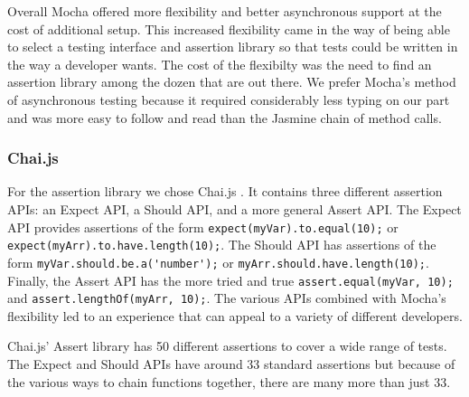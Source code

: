 \documentclass[12pt]{ucthesis}
\begin{document}
Overall Mocha offered more flexibility and better asynchronous support at the cost of additional setup. This increased flexibility came in the way of being able to select a testing interface and assertion library so that tests could be written in the way a developer wants. The cost of the flexibilty was the need to find an assertion library among the dozen that are out there. We prefer Mocha's method of asynchronous testing because it required considerably less typing on our part and was more easy to follow and read than the Jasmine chain of method calls.

\subsubsection{Chai.js}
For the assertion library we chose Chai.js \cite{Chaijs}. It contains three different assertion APIs: an Expect API, a Should API, and a more general Assert API. The Expect API provides assertions of the form \lstinline{expect(myVar).to.equal(10);} or \lstinline{expect(myArr).to.have.length(10);}. The Should API has assertions of the form \lstinline{myVar.should.be.a('number');} or \lstinline{myArr.should.have.length(10);}. Finally, the Assert API has the more tried and true \lstinline{assert.equal(myVar, 10);} and \newline \lstinline{assert.lengthOf(myArr, 10);}. The various APIs combined with Mocha's flexibility led to an experience that can appeal to a variety of different developers.

Chai.js' Assert library has 50 different assertions to cover a wide range of tests. The Expect and Should APIs have around 33 standard assertions but because of the various ways to chain functions together, there are many more than just 33.
\end{document}
